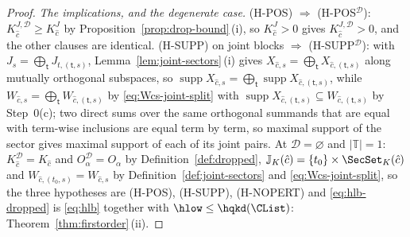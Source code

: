 \begin{proof}
\emph{The implications, and the degenerate case.} (H-POS)
$\Rightarrow$ (H-POS$^{\mathcal{D}}$): $K^{J,\mathcal{D}}_{\hat c}\ge
K^{J}_{\hat c}$ by
Proposition~\ref{prop:drop-bound}\,(i), so
$K^{J}_{\hat c}>0$ gives $K^{J,\mathcal{D}}_{\hat c}>0$, and the other clauses
are identical. (H-SUPP) on joint blocks $\Rightarrow$
(H-SUPP$^{\mathcal{D}}$): with $J_s=\bigoplus_{\mathsf t}J_{t,(\mathsf t,s)}$,
Lemma~\ref{lem:joint-sectors}\,(i) gives
$X_{\hat c,s}=\bigoplus_{\mathsf t}X_{\hat c,(\mathsf t,s)}$ along mutually
orthogonal subspaces, so $\operatorname{supp}X_{\hat c,s}
=\bigoplus_{\mathsf t}\operatorname{supp}X_{\hat c,(\mathsf t,s)}$, while
$W_{\hat c,s}=\bigoplus_{\mathsf t}W_{\hat c,(\mathsf t,s)}$ by
\eqref{eq:Wcs-joint-split} with
$\operatorname{supp}X_{\hat c,(\mathsf t,s)}\subseteq
W_{\hat c,(\mathsf t,s)}$ by Step~0(c); two direct sums over the same
orthogonal summands that are equal with term-wise inclusions are equal term by
term, so maximal support of the sector gives maximal support of each of its
joint pairs. At $\mathcal{D}=\varnothing$ and $|\mathbb{T}|=1$:
$K^{\mathcal{D}}_{\hat c}=K_{\hat c}$ and
$O^{\mathcal{D}}_{\alpha}=O_{\alpha}$ by
Definition~\ref{def:dropped},
$\mathbb{J}_K(\hat c)=\{t_0\}\times\SecSet_K(\hat c)$ and
$W_{\hat c,(t_0,s)}=W_{\hat c,s}$ by
Definition~\ref{def:joint-sectors} and
\eqref{eq:Wcs-joint-split}, so the three hypotheses are (H-POS), (H-SUPP),
(H-NOPERT) and \eqref{eq:hlb-dropped} is \eqref{eq:hlb} together with
$\hlow\le\hqkd(\CList)$: Theorem~\ref{thm:firstorder}\,(ii).


\end{proof}
